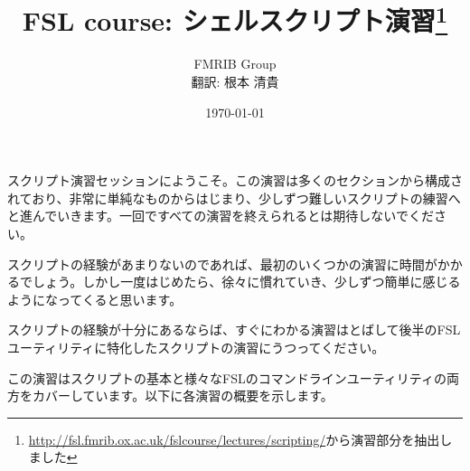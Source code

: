 \documentclass{jsarticle}
\begin{document}
\title{FSL course: シェルスクリプト演習\thanks{\url{http://fsl.fmrib.ox.ac.uk/fslcourse/lectures/scripting/}から演習部分を抽出しました}}
\author{FMRIB Group \\ 翻訳: 根本 清貴}
\date{\today}
\maketitle

\thispagestyle{empty}


\newpage

スクリプト演習セッションにようこそ。この演習は多くのセクションから構成されており、非常に単純なものからはじまり、少しずつ難しいスクリプトの練習へと進んでいきます。一回ですべての演習を終えられるとは期待しないでください。

スクリプトの経験があまりないのであれば、最初のいくつかの演習に時間がかかるでしょう。しかし一度はじめたら、徐々に慣れていき、少しずつ簡単に感じるようになってくると思います。

スクリプトの経験が十分にあるならば、すぐにわかる演習はとばして後半のFSLユーティリティに特化したスクリプトの演習にうつってください。

この演習はスクリプトの基本と様々なFSLのコマンドラインユーティリティの両方をカバーしています。以下に各演習の概要を示します。
\end{document}

